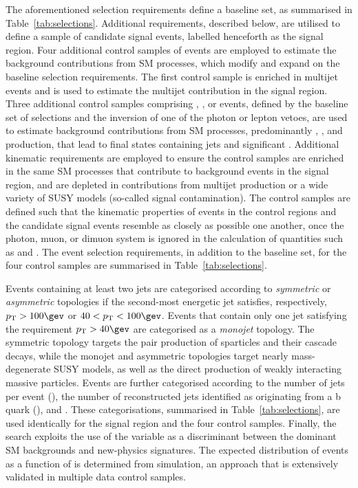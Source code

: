 The aforementioned selection requirements define a baseline set, as
summarised in Table~\ref{tab:selections}. Additional requirements,
described below, are utilised to define a sample of candidate signal
events, labelled henceforth as the signal region. Four additional
control samples of events are employed to estimate the background
contributions from SM processes, which modify and expand on the
baseline selection requirements. The first control sample is enriched
in multijet events and is used to estimate the multijet contribution
in the signal region. Three additional control samples comprising \gj,
\mj, or \mmj events, defined by the baseline set of selections and the
inversion of one of the photon or lepton vetoes, are used to estimate
background contributions from SM processes, predominantly \wlj,
\znunuj, and \ttbar production, that lead to final states containing
jets and significant \ptvecmiss. Additional kinematic requirements
are employed to ensure the control samples are enriched in the same SM
processes that contribute to background events in the signal region,
and are depleted in contributions from multijet production or a wide
variety of SUSY models (\ie so-called signal contamination).  The
control samples are defined such that the kinematic properties of
events in the control regions and the candidate signal events resemble
as closely as possible one another, once the photon, muon, or dimuon
system is ignored in the calculation of quantities such as \scalht and
\HTmiss. The event selection requirements, in addition to the baseline
set, for the four control samples are summarised in
Table~\ref{tab:selections}.

Events containing at least two jets are categorised according to {\it
  symmetric} or {\it asymmetric} topologies if the second-most
energetic jet satisfies, respectively, $\Pt > 100\gev$ or $40 < \Pt <
100\gev$. Events that contain only one jet satisfying the requirement
$\Pt > 40\gev$ are categorised as a {\it monojet} topology. The
symmetric topology targets the pair production of sparticles and their
cascade decays, while the monojet and asymmetric topologies target
nearly mass-degenerate SUSY models, as well as the direct production
of weakly interacting massive particles. Events are further
categorised according to the number of jets per event (\njet), the
number of reconstructed jets identified as originating from a b quark
(\nb), and \scalht. These categorisations, summarised in
Table~\ref{tab:selections}, are used identically for the signal region
and the four control samples. Finally, the search exploits the use of
the \mht variable as a discriminant between the dominant SM
backgrounds and new-physics signatures. The expected distribution of
events as a function of \mht is determined from simulation, an
approach that is extensively validated in multiple data control
samples.

